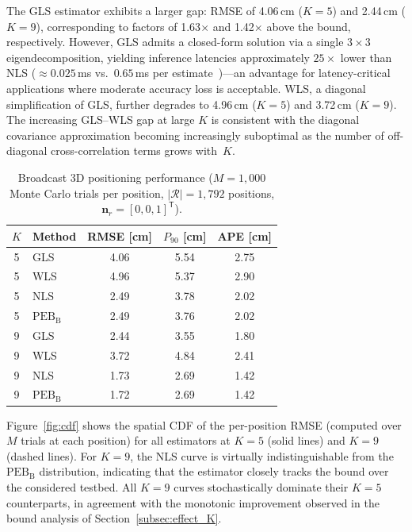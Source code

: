 \documentclass[conference]{IEEEtran}
\begin{document}
The GLS estimator exhibits a larger gap: RMSE of 4.06\,cm ($K=5$) and 2.44\,cm ($K=9$), corresponding to factors of 1.63$\times$ and 1.42$\times$ above the bound, respectively.
However, GLS admits a closed-form solution via a single $3{\times}3$ eigendecomposition, yielding inference latencies approximately $25\times$ lower than NLS (${\approx}0.025$\,ms vs.\ $0.65$\,ms per estimate~\cite{AcunaTCOM2025})---an advantage for latency-critical applications where moderate accuracy loss is acceptable.
WLS, a diagonal simplification of GLS, further degrades to 4.96\,cm ($K=5$) and 3.72\,cm ($K=9$).
The increasing GLS--WLS gap at large $K$ is consistent with the diagonal covariance approximation becoming increasingly suboptimal as the number of off-diagonal cross-correlation terms grows with~$K$.

\begin{table}[t]
\centering
\caption{Broadcast 3D positioning performance ($M{=}1{,}000$ Monte Carlo trials per position, $|\mathcal{R}|{=}1{,}792$ positions, $\mathbf{n}_r{=}[0,0,1]^{\mathsf T}$).}
\label{tab:results}
\begin{tabular}{clccc}
\toprule
$K$ & Method & RMSE [cm] & $P_{90}$ [cm] & APE [cm] \\
\midrule
5 & GLS   & 4.06 & 5.54 & 2.75 \\
5 & WLS   & 4.96 & 5.37 & 2.90 \\
5 & NLS   & 2.49 & 3.78 & 2.02 \\
5 & $\mathrm{PEB}_\mathrm{B}$ & 2.49 & 3.76 & 2.02 \\
\midrule
9 & GLS   & 2.44 & 3.55 & 1.80 \\
9 & WLS   & 3.72 & 4.84 & 2.41 \\
9 & NLS   & 1.73 & 2.69 & 1.42 \\
9 & $\mathrm{PEB}_\mathrm{B}$ & 1.72 & 2.69 & 1.42 \\
\bottomrule
\end{tabular}
\end{table}

Figure~\ref{fig:cdf} shows the spatial CDF of the per-position RMSE (computed over $M$ trials at each position) for all estimators at $K=5$ (solid lines) and $K=9$ (dashed lines).
For $K=9$, the NLS curve is virtually indistinguishable from the $\mathrm{PEB}_\mathrm{B}$ distribution, indicating that the estimator closely tracks the bound over the considered testbed.
All $K=9$ curves stochastically dominate their $K=5$ counterparts, in agreement with the monotonic improvement observed in the bound analysis of Section~\ref{subsec:effect_K}.
\end{document}
